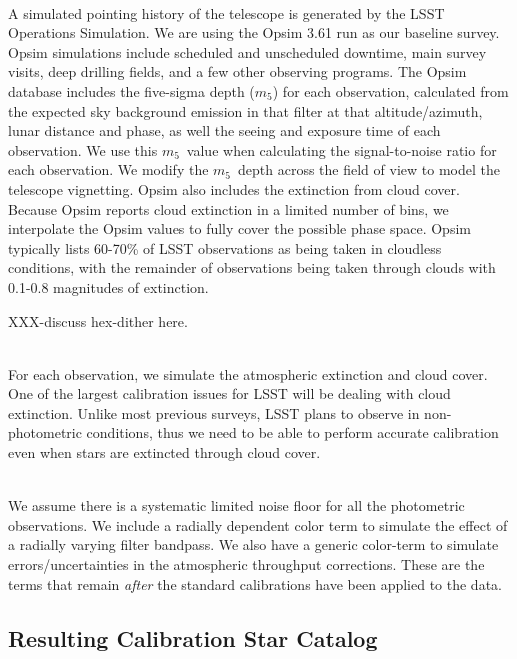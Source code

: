 \documentclass[12pt,preprint]{aastex}
\begin{document}
\\
A simulated pointing history of the telescope is generated by the LSST Operations Simulation. We are using the Opsim 3.61 run as our baseline survey.  Opsim simulations include scheduled and unscheduled downtime, main survey visits, deep drilling fields, and a few other observing programs. The Opsim database includes the five-sigma depth ($m_5$) for each observation, calculated from the expected sky background emission in that filter at that altitude/azimuth, lunar distance and phase, as well the seeing and exposure time of each observation.  We use this $m_5$\ value when calculating the signal-to-noise ratio for each observation.  We modify the $m_5$\ depth across the field of view to model the telescope vignetting.  Opsim also includes the extinction from cloud cover.  Because Opsim reports cloud extinction in a limited number of bins, we interpolate the Opsim values to fully cover the possible phase space.  Opsim typically lists 60-70\% of LSST observations as being taken in cloudless conditions, with the remainder of observations being taken through clouds with 0.1-0.8 magnitudes of extinction.  

XXX-discuss hex-dither here.


\\
For each observation, we simulate the atmospheric extinction and cloud cover.  One of the largest calibration issues for LSST will be dealing with cloud extinction.  Unlike most previous surveys, LSST plans to observe in non-photometric conditions, thus we need to be able to perform accurate calibration even when stars are extincted through cloud cover.  



\\
We assume there is a systematic limited noise floor for all the photometric observations.  We include a radially dependent color term to simulate the effect of a radially varying filter bandpass.  We also have a generic color-term to simulate errors/uncertainties in the atmospheric throughput corrections.  These are the terms that remain {\emph{after}} the standard calibrations have been applied to the data. 


\subsection{Resulting Calibration Star Catalog}
\end{document}
